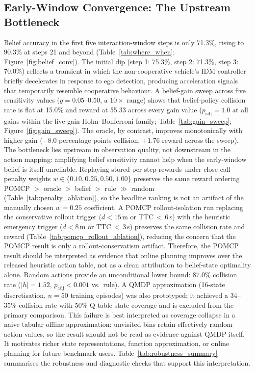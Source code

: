 \subsection{Early-Window Convergence: The Upstream Bottleneck}
\label{sec:results_bottleneck}
Belief accuracy in the first five interaction-window steps is only 71.3\%,
rising to 90.3\% at steps 21 and beyond (Table~\ref{tab:where_when};
Figure~\ref{fig:belief_conv}).
The initial dip (step 1: 75.3\%, step 2: 71.3\%, step 3: 70.0\%) reflects
a transient in which the non-cooperative vehicle's IDM controller briefly
decelerates in response to ego detection, producing acceleration signals
that temporarily resemble cooperative behaviour.
A belief-gain sweep across five sensitivity values ($g{=}0.05$--$0.50$,
a $10{\times}$ range) shows that belief-policy collision rate is flat at
15.0\% and reward at 55.33 across every gain value
($p_\text{adj}{=}1.0$ at all gains within the five-gain Holm--Bonferroni family; Table~\ref{tab:gain_sweep};
Figure~\ref{fig:gain_sweep}).
The oracle, by contrast, improves monotonically with higher gain ($-8.0$
percentage points collision, $+1.76$ reward across the sweep).
The bottleneck lies upstream in observation quality, not downstream in the
action mapping: amplifying belief sensitivity cannot help when the
early-window belief is itself unreliable.
Replaying stored per-step rewards under close-call penalty weights
$w\in\{0.10,0.25,0.50,1.00\}$ preserves the same reward ordering
POMCP $>$ oracle $>$ belief $>$ rule $\gg$ random
(Table~\ref{tab:penalty_ablation}), so the headline ranking is not an
artifact of the manually chosen $w{=}0.25$ coefficient.
A POMCP rollout-isolation run replacing the conservative rollout trigger
($d{<}15$\,m or TTC\,$<$\,6\,s) with the heuristic emergency trigger
($d{<}8$\,m or TTC\,$<$\,3\,s) preserves the same collision rate and reward
(Table~\ref{tab:pomcp_rollout_ablation}), reducing the concern that the
POMCP result is only a rollout-conservatism artifact.
Therefore, the POMCP result should be interpreted as evidence that online
planning improves over the released heuristic action table, not as a clean
attribution to belief-state optimality alone.
Random actions provide an unconditional lower bound:
87.0\% collision rate ($|h|{=}1.52$, $p_\text{adj}{<}0.001$ vs.\ rule).
A QMDP approximation (16-state discretisation, $n{=}50$ training
episodes) was also prototyped; it achieved a 34--35\% collision rate with
50\% Q-table state coverage and is excluded from the primary comparison.
This failure is best interpreted as coverage collapse in a naive tabular
offline approximation: unvisited bins retain effectively random action values,
so the result should not be read as evidence against QMDP itself.
It motivates richer state representations, function approximation, or online
planning for future benchmark users.
Table~\ref{tab:robustness_summary} summarises the robustness and diagnostic
checks that support this interpretation.


